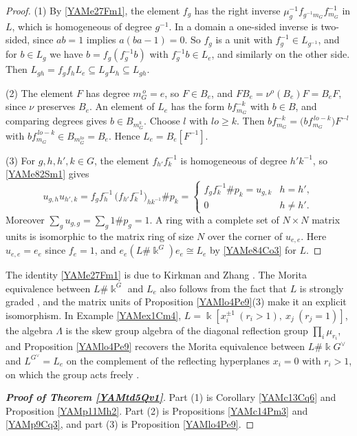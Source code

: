 \documentclass[reqno]{amsart}
\numberwithin{equation}{section}
\theoremstyle{definition}
\theoremstyle{remark}
\theoremstyle{plain}
\newcommand{\kk}{\Bbbk}
\begin{document}
\begin{proof}
(1) By \eqref{YAMe27Fm1}, the element $f_g$ has the right inverse $\mu_g^{-1}f_{g^{-1}m_G}f_{m_G}^{-1}$ in $L$, which is homogeneous of degree $g^{-1}$. In a domain a one-sided inverse is two-sided, since $ab=1$ implies $a(ba-1)=0$. So $f_g$ is a unit with $f_g^{-1}\in L_{g^{-1}}$, and for $b\in L_g$ we have $b=f_g(f_g^{-1}b)$ with $f_g^{-1}b\in L_e$, and similarly on the other side. Then $L_{gh}=f_gf_hL_e\subseteq L_gL_h\subseteq L_{gh}$.

(2) The element $F$ has degree $m_G^{\,o}=e$, so $F\in B_e$, and $FB_e=\nu^o(B_e)F=B_eF$, since $\nu$ preserves $B_e$. An element of $L_e$ has the form $bf_{m_G}^{-k}$ with $b\in B$, and comparing degrees gives $b\in B_{m_G^k}$. Choose $l$ with $lo\ge k$. Then $bf_{m_G}^{-k}=\big(bf_{m_G}^{\,lo-k}\big)F^{-l}$ with $bf_{m_G}^{\,lo-k}\in B_{m_G^{lo}}=B_e$. Hence $L_e=B_e[F^{-1}]$.

(3) For $g,h,h',k\in G$, the element $f_{h'}f_k^{-1}$ is homogeneous of degree $h'k^{-1}$, so \eqref{YAMe82Sm1} gives
\[
u_{g,h}u_{h',k}=f_gf_h^{-1}\,\big(f_{h'}f_k^{-1}\big)_{hk^{-1}}\#p_k=\begin{cases}f_gf_k^{-1}\#p_k=u_{g,k}&h=h',\\0&h\neq h'.\end{cases}
\]
Moreover $\sum_gu_{g,g}=\sum_g1\#p_g=1$. A ring with a complete set of $N\times N$ matrix units is isomorphic to the matrix ring of size $N$ over the corner of $u_{e,e}$. Here $u_{e,e}=e_e$ since $f_e=1$, and $e_e(L\#\kk^G)e_e\cong L_e$ by \eqref{YAMe84Co3} for $L$.
\end{proof}

The identity \eqref{YAMe27Fm1} is due to Kirkman and Zhang \cite[Lemma 2.11(2)]{KZ}. The Morita equivalence between $L\#\kk^G$ and $L_e$ also follows from the fact that $L$ is strongly graded \cite[Theorem 2.12]{CoMo}, and the matrix units of Proposition \ref{YAMlo4Pe9}(3) make it an explicit isomorphism. In Example \ref{YAMex1Cm4}, $L=\kk[x_i^{\pm1}\ (r_i>1),\ x_j\ (r_j=1)]$, the algebra $\Lambda$ is the skew group algebra of the diagonal reflection group $\prod_i\mu_{r_i}$, and Proposition \ref{YAMlo4Pe9} recovers the Morita equivalence between $L\#\kk G^\vee$ and $L^{G^\vee}=L_e$ on the complement of the reflecting hyperplanes $x_i=0$ with $r_i>1$, on which the group acts freely \cite[Theorem 1.5]{Ste}.

\begin{proof}[\textnormal{\bfseries Proof of Theorem \ref{YAMtd5Qv1}}]
Part (1) is Corollary \ref{YAMc13Cq6} and Proposition \ref{YAMp11Mh2}. Part (2) is Propositions \ref{YAMc14Pm3} and \ref{YAMp9Cq3}, and part (3) is Proposition \ref{YAMlo4Pe9}.
\end{proof}
\end{document}
